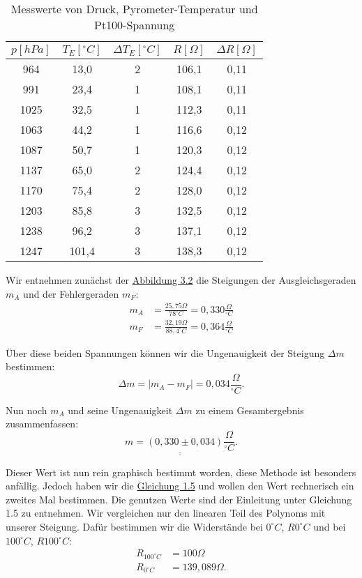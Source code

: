 \begin{table}[h!]   
    \centering
    \begin{tabular}{c | c | c | c | c}
        \textbf{$p [hPa]$} & \textbf{$T_{E} [^\circ C]$} & \textbf{$\Delta T_{E} [^\circ C]$} & \textbf{$R [\Omega]$} & \textbf{$\Delta R [\Omega]$} \\
        \hline
         964  & 13,0 & 2 & 106,1 & 0,11\\
         991  & 23,4 & 1 & 108,1 & 0,11\\
        1025  & 32,5 & 1 & 112,3 & 0,11\\
        1063  & 44,2 & 1 & 116,6 & 0,12\\
        1087  & 50,7 & 1 & 120,3 & 0,12\\
        1137  & 65,0 & 2 & 124,4 & 0,12\\
        1170  & 75,4 & 2 & 128,0 & 0,12\\
        1203  & 85,8 & 3 & 132,5 & 0,12\\
        1238  & 96,2 & 3 & 137,1 & 0,12\\
        1247  & 101,4 & 3 & 138,3 & 0,12\\
    \end{tabular}
    \label{tab:pt_100}
    \caption{Messwerte von Druck, Pyrometer-Temperatur und Pt100-Spannung}  
\end{table}

Wir entnehmen zunächst der \hyperref[fig:graphisch_temp_widerstand]{Abbildung 3.2} die Steigungen der Ausgleichsgeraden $m_A$ und der Fehlergeraden $m_F$:
\begin{align}
    m_A &= \frac{25,75 \Omega}{78^\circ C} = 0,330 \frac{\Omega}{^\circ C} \\
    m_F &= \frac{32,19 \Omega}{88,4^\circ C} = 0,364 \frac{\Omega}{^\circ C}
\end{align}

Über diese beiden Spannungen können wir die Ungenauigkeit der Steigung $\Delta m$ bestimmen:
\begin{equation}
    \Delta m = \left| m_A - m_F \right| = 0,034 \frac{\Omega}{^\circ C}.
\end{equation}

Nun noch $m_A$ und seine Ungenauigkeit $\Delta m$ zu einem Gesamtergebnis zusammenfassen:
\begin{equation}
   \underline{\underline{m = (0,330 \pm 0,034) \frac{\Omega}{^\circ C}}}.
\end{equation}

Dieser Wert ist nun rein graphisch bestimmt worden, diese Methode ist besonders anfällig. Jedoch haben wir die \hyperref[eq:r_von_t]{Gleichung 1.5} und wollen den Wert rechnerisch ein zweites Mal bestimmen.
Die genutzen Werte sind der Einleitung unter Gleichung 1.5 zu entnehmen. Wir vergleichen nur den linearen Teil des Polynoms mit unserer Steigung. Dafür bestimmen wir die Widerstände bei $0^\circ C$, $R{0^\circ C}$ 
und bei $100^\circ C$, $R{100^\circ C}$:
\begin{align}
    R_{100^\circ C} &= 100 \Omega\\
    R_{0^\circ C} &= 139,089 \Omega.
\end{align}


